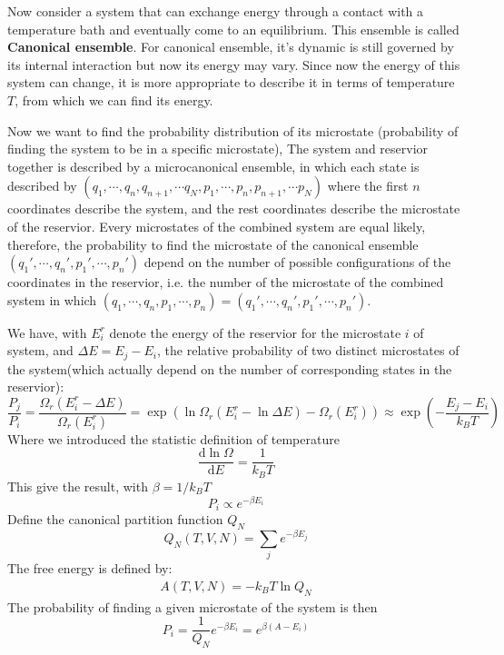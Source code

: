 \documentclass{article}
\newcommand{\dnor}{\text{d}}
\begin{document}
Now consider a system that can exchange energy through a contact with a temperature bath and eventually 
come to an equilibrium. This ensemble is called \textbf{Canonical ensemble}. For canonical ensemble, 
it's dynamic is still governed by its internal interaction but now its energy may vary. Since now 
the energy of this system can change, it is more appropriate to describe it in terms of 
temperature $T$, from which we can find its energy. 

Now we want to find the probability distribution of its microstate (probability of finding the system 
to be in a specific microstate), The system and reservior together is described by a microcanonical 
ensemble, in which each state is described by $(q_1,\cdots, q_n, q_{n+1}, \cdots q_{N}, p_1,\cdots, p_n, p_{n+1}, \cdots p_{N})$
where the first $n$ coordinates describe the system, and the rest coordinates describe the 
microstate of the reservior. Every microstates of the combined system are equal likely, therefore,
the probability to find the microstate of the canonical ensemble $(q_1',\cdots, q_n',p_1',\cdots, p_n')$ depend on the number 
of possible configurations of the coordinates in the reservior, i.e. the number of the 
microstate of the combined system in which $(q_1,\cdots, q_n,p_1,\cdots, p_n) = (q_1',\cdots, q_n',p_1',\cdots, p_n')$.

We have, with $E^r_i$ denote the energy of the reservior for 
the microstate $i$ of system, and $\Delta E = E_j - E_i$, the relative probability of two 
distinct microstates of the system(which actually depend on the number of corresponding states in the reservior):
\begin{equation}
    \frac{P_j}{P_i} = \frac{\Omega_r(E^r_i - \Delta E)}{\Omega_r(E^r_i)} = \exp\left( \ln \Omega_r(E^r_i - \ln\Delta E)-\Omega_r(E^r_i) \right)
    \approx \exp\left( -\frac{E_j-E_i}{k_BT} \right)
\end{equation}
Where we introduced the statistic definition of temperature
\begin{equation}
    \frac{\dnor \ln\Omega}{\dnor E} = \frac{1}{k_B T}
\end{equation}
This give the result, with $\beta = 1/k_BT$
\begin{equation}
    P_i \propto e^{-\beta E_i}
\end{equation}
Define the canonical partition function $Q_N$
\begin{equation}
    Q_N(T,V,N) = \sum_j e^{-\beta E_j}
\end{equation}
The free energy is defined by:
\begin{gather}
    A(T,V,N) = -k_BT\ln Q_N
\end{gather}
The probability of finding a given microstate of the system is then
\begin{equation}
    P_i = \frac{1}{Q_N} e^{-\beta E_i} = e^{\beta(A - E_i)}
\end{equation}
\end{document}
